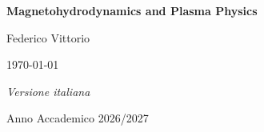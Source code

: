 \documentclass[a4paper, 10 pt]{book}
\begin{document}
\begin{titlepage}
    \centering
    \vspace*{3cm}
    {\Huge\bfseries Magnetohydrodynamics and Plasma Physics\par}
    
    \vspace{1.5cm}
    {\Large Federico Vittorio\par}
    
    \vspace{0.6cm}
    {\large \today\par}
    
    \vfill
    
   {\normalsize\itshape Versione italiana\par}
    \vspace{0.3cm}
    {\large Anno Accademico 2026/2027\par}
    \vspace*{1cm}
\end{titlepage}
\tableofcontents



























\end{document}

